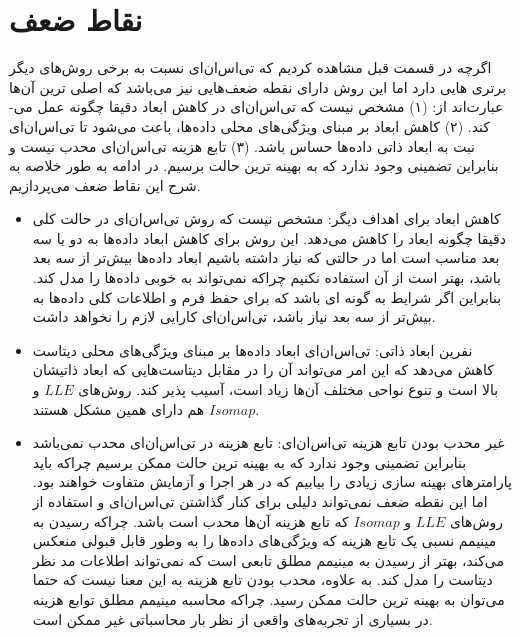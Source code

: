 \section{نقاط ضعف}
اگرچه در قسمت قبل مشاهده کردیم که تی‌اس‌ان‌ای نسبت به برخی روش‌های دیگر برتری هایی دارد اما این روش دارای نقطه ضعف‌هایی نیز می‌باشد که اصلی ترین آن‌ها عبارت‌اند از: (‌۱) مشخص نیست که تی‌اس‌ان‌ای در کاهش ابعاد دقیقا چگونه عمل می-کند. (۲) کاهش ابعاد بر مبنای ویژگی‌های محلی داده‌ها، باعث می‌شود تا تی‌اس‌ان‌ای نبت به ابعاد ذاتی داده‌ها حساس باشد. (۳) تابع هزینه تی‌اس‌ان‌ای محدب نیست و بنابراین تضمینی وجود ندارد که به بهینه ترین حالت برسیم. در ادامه به طور خلاصه به شرح این نقاط ضعف می‌پردازیم.
\begin{itemize}
\item 	کاهش ابعاد برای اهداف دیگر: مشخص نیست که روش تی‌اس‌ان‌ای  در حالت کلی دقیقا چگونه ابعاد را کاهش می‌دهد. این روش برای کاهش ابعاد داده‌ها به دو یا سه بعد مناسب است اما در حالتی که نیاز داشته باشیم ابعاد داده‌ها بیش‌تر از سه بعد باشد، بهتر است از آن استفاده نکنیم چراکه نمی‌تواند به خوبی داده‌‌ها را مدل کند. بنابراین اگر شرایط به گونه ای باشد که برای حفظ فرم و اطلاعات کلی داده‌ها به بیش‌تر از سه بعد نیاز باشد، تی‌اس‌ان‌ای کارایی لازم را نخواهد داشت.
\item 	نفرین ابعاد ذاتی: تی‌اس‌ان‌ای ابعاد داده‌ها بر مبنای ویژگی‌های محلی دیتاست کاهش می‌دهد که این امر می‌تواند آن را در مقابل دیتاست‌هایی که ابعاد ذاتیشان بالا است و تنوع نواحی مختلف آن‌ها زیاد است، آسیب پذیر کند. روش‌های $LLE$ و $Isomap$ هم دارای همین مشکل هستند.
\item	غیر محدب بودن تابع هزینه تی‌اس‌ان‌ای: تابع هزینه در تی‌اس‌ان‌ای محدب نمی‌باشد بنابراین تضمینی وجود ندارد که به بهینه ترین حالت ممکن برسیم چراکه باید پارامترهای بهینه سازی زیادی را بیابیم که در هر اجرا و آزمایش متفاوت خواهند بود. اما این نقطه ضعف نمی‌تواند دلیلی برای کنار گذاشتن تی‌اس‌ان‌ای و استفاده از روش‌های $LLE$ و $Isomap$ که تابع هزینه آن‌ها محدب است باشد. چراکه رسیدن به مینیمم نسبی یک تابع هزینه که ویژگی‌های داده‌ها را به وطور قابل قبولی منعکس می‌کند، بهتر از رسیدن به مینیمم مطلق تابعی است که نمی‌تواند اطلاعات مد نظر دیتاست را مدل کند. به علاوه، محدب بودن تابع هزینه به این معنا نیست که حتما می‌توان به بهینه ترین حالت ممکن رسید. چراکه محاسبه مینیمم مطلق توابع هزینه در بسیاری از تجربه‌های واقعی از نظر بار محاسباتی غیر ممکن است.
\end{itemize}

